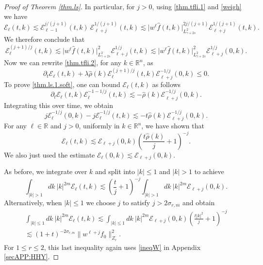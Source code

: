 \documentclass{amsart}
\numberwithin{equation}{section}
\begin{document}
\begin{proof}[Proof of Theorem \ref{thm.ls}]
In particular, for ${j}>0$, using \eqref{thm.tfli.1} and \eqref{weigh} we have
$$
\mathcal{E}_{\ell}(t,k)
\lesssim
 \mathcal{E}_{{\ell}-1}^{{j}/({j}+1)}(t,k) ~ \mathcal{E}_{{\ell}+{j}}^{1/({j}+1)}(t,k)
\lesssim
{|} w^{\ell}  \hat{f}(t,k){|}_{L^2_{\gamma+2s}}^{2 {j}/({j}+1)}\mathcal{E}_{{\ell}+{j}}^{1/({j}+1)}(t,k).
$$
We therefore conclude that
$$
\mathcal{E}_{\ell}^{({j}+1)/{j}}(t,k)
\lesssim
{|} w^{\ell}  \hat{f}(t,k){|}_{L^2_{\gamma+2s}}^{2 }\mathcal{E}_{{\ell}+{j}}^{1/{j}}(t,k)
\lesssim
{|} w^{\ell}  \hat{f}(t,k){|}_{L^2_{\gamma+2s}}^{2 }\mathcal{E}_{{\ell}+{j}}^{1/{j}}(0,k).
$$
Now we can rewrite \eqref{thm.tfli.2}, for any  $k\in {{\mathbb R}^{n}}$, as
\begin{equation*}
    {\partial}_t {\mathcal{E}}_{\ell}(t,k)+ {\lambda} {\hat{\rho}}(k)  \mathcal{E}_{\ell}^{({j}+1)/{j}}(t,k)\mathcal{E}_{{\ell}+{j}}^{-1/{j}}(0,k)  \leq 0.
\end{equation*}
To prove \eqref{thm.ls.1.soft}, one can bound ${\mathcal{E}}_{\ell}(t,k)$ as follows
\begin{equation*}
    {\partial}_t {\mathcal{E}}_{\ell}(t,k)  \mathcal{E}_{\ell}^{-1-1/{j}}(t,k)    \lesssim -{\hat{\rho}}(k)  \mathcal{E}_{{\ell}+{j}}^{-1/{j}}(0,k).
\end{equation*}
Integrating this over time, we obtain  
\begin{equation*}
    {j} {\mathcal{E}}_{\ell}^{-1/{j}}(0,k) - {j} \mathcal{E}_{\ell}^{-1/{j}}(t,k)    \lesssim - t {\hat{\rho}}(k)  \mathcal{E}_{{\ell}+{j}}^{-1/{j}}(0,k).
\end{equation*}
For any ${\ell} \in {\mathbb{R}}$ and ${j}>0$, uniformly in $k\in {{\mathbb R}^{n}}$, we have shown that
\begin{equation*}
     \mathcal{E}_{\ell}(t,k)    \lesssim
    \mathcal{E}_{{\ell}+{j}}(0,k) 
    \left(\frac{ t {\hat{\rho}}(k)}{j}   + 1\right)^{-{j}}.
\end{equation*}
We also just used the estimate $\mathcal{E}_{\ell}(0,k) \lesssim\mathcal{E}_{{\ell}+{j}}(0,k)$.

As before, we integrate over $k$ and split into $|k|\leq 1$ and $|k|> 1$ to achieve
\begin{equation*}
\int_{|k| > 1}dk~ |k|^{2m}
     \mathcal{E}_{\ell}(t,k)   \lesssim
     \left(\frac{ t }{j}   + 1\right)^{-{j}}
  \int_{|k|> 1}dk~ |k|^{2m}  \mathcal{E}_{{\ell}+{j}}(0,k).
\end{equation*}
Alternatively, when $|k|\leq 1$ we choose ${j}$ to satisfy ${j} > 2 \sigma_{r,m}$ and obtain  
\begin{multline*}
\int_{|k| \leq 1}dk~ |k|^{2m}
     \mathcal{E}_{\ell}(t,k)    
\lesssim     
     \int_{|k| \leq 1}dk~ |k|^{2m}
    \mathcal{E}_{{\ell}+{j}}(0,k) 
    \left(\frac{ t |k|^2}{j}   + 1\right)^{-{j}}
    \\
    \lesssim     
    \left( 1   + t\right)^{-2\sigma_{r,m}}
     \| w^{{\ell}+{j}} {f}_0\|_{Z_r}^2.
\end{multline*}
For $1\le r \le 2$, this last inequality again uses \eqref{ineqW} in Appendix \ref{secAPP:HHY}.
\end{proof}
\end{document}
